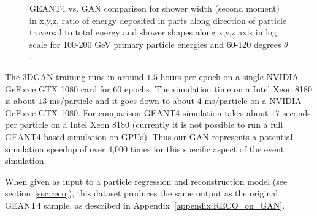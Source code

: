 \begin{figure}
    \centering
    \caption{GEANT4 vs. GAN comparison for shower width (second
      moment) in x,y,z, ratio of energy deposited in parts along
      direction of particle traversal to total energy and shower
      shapes along x,y,z axis in log scale for 100-200 GeV primary
      particle energies and 60-120 degrees $\theta$.
      \label{fig:GAN_features2}}
\end{figure}

The 3DGAN training runs in around $1.5$ hours per epoch on a single NVIDIA GeForce GTX 1080 card for $60$ epochs. The simulation  time  on a Intel  Xeon 8180  is about $13$ ms/particle  and it goes down to about $4$ ms/particle on a NVIDIA  GeForce  GTX  1080. For  comparison  GEANT4  simulation takes  about $17$ seconds  per  particle on  a  Intel  Xeon  8180 (currently  it  is  not  possible  to  run a full  GEANT4-based  simulation  on  GPUs). Thus our GAN represents a potential simulation speedup of over 4,000 times for this specific aspect of the event simulation.

When given as input to a particle regression and reconstruction model (see section~\ref{sec:reco}), this dataset produces the same output as the original GEANT4 sample, as described in Appendix~\ref{appendix:RECO_on_GAN}.